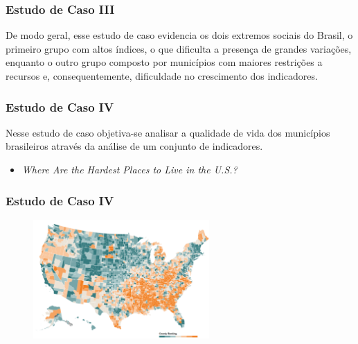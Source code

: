 \documentclass[aspectratio=169]{beamer}
\begin{document}
\begin{frame}
\frametitle{Estudo de Caso III}
\justifying

De modo geral, esse estudo de caso evidencia os dois extremos sociais do Brasil, o primeiro grupo com altos índices,
o que dificulta a presença de grandes variações, enquanto o outro grupo composto por municípios com maiores restrições
a recursos e, consequentemente, dificuldade no crescimento dos indicadores.

\end{frame}

\begin{frame}
\frametitle{Estudo de Caso IV}
\justifying

Nesse estudo de caso objetiva-se analisar a qualidade de vida dos municípios brasileiros através da análise de
um conjunto de indicadores.

\begin{itemize}
\item \textit{Where Are the Hardest Places to Live in the U.S.?}
\end{itemize}

\end{frame}


\begin{frame}
\frametitle{Estudo de Caso IV}
\justifying

\begin{figure}
\centering
\includegraphics[width=0.6\textwidth]{images/usa.png}
\end{figure}

\end{frame}
\end{document}
